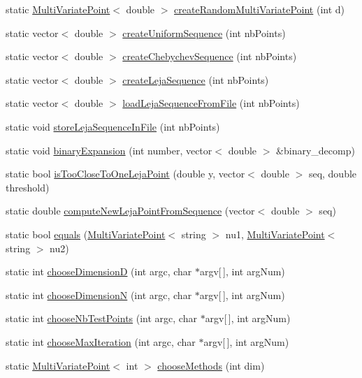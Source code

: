 \begin{DoxyCompactItemize}
\item 
static \hyperlink{class_multi_variate_point}{Multi\+Variate\+Point}$<$ double $>$ \hyperlink{class_utils_a09a5b487abbd8c2233734aed6679a13a}{create\+Random\+Multi\+Variate\+Point} (int d)
\item 
static vector$<$ double $>$ \hyperlink{class_utils_aa03bde098ebd8a96a4a12b9581ea4721}{create\+Uniform\+Sequence} (int nb\+Points)
\item 
static vector$<$ double $>$ \hyperlink{class_utils_aa8b8ff1c9c1d271633aa9dd36990bd27}{create\+Chebychev\+Sequence} (int nb\+Points)
\item 
static vector$<$ double $>$ \hyperlink{class_utils_a829167caad4d105e52c1d4af4924a358}{create\+Leja\+Sequence} (int nb\+Points)
\item 
static vector$<$ double $>$ \hyperlink{class_utils_a13a74fc44a3300bc4053c92a98f9b55a}{load\+Leja\+Sequence\+From\+File} (int nb\+Points)
\item 
static void \hyperlink{class_utils_ace57ec8e6b8ac71fc13588c32f8e449e}{store\+Leja\+Sequence\+In\+File} (int nb\+Points)
\item 
static void \hyperlink{class_utils_a6ebd26c0dd01e720bcffc849c8a80e19}{binary\+Expansion} (int number, vector$<$ double $>$ \&binary\+\_\+decomp)
\item 
static bool \hyperlink{class_utils_aae5c071adea20e986aabc71119edb16f}{is\+Too\+Close\+To\+One\+Leja\+Point} (double y, vector$<$ double $>$ seq, double threshold)
\item 
static double \hyperlink{class_utils_a66a782d0cbfd519114e83c7be8139fea}{compute\+New\+Leja\+Point\+From\+Sequence} (vector$<$ double $>$ seq)
\item 
static bool \hyperlink{class_utils_ac7682da7749f473263a0f5dcdff946ce}{equals} (\hyperlink{class_multi_variate_point}{Multi\+Variate\+Point}$<$ string $>$ nu1, \hyperlink{class_multi_variate_point}{Multi\+Variate\+Point}$<$ string $>$ nu2)
\item 
static int \hyperlink{class_utils_ad56041abf23e7685a62bceef03a1042c}{choose\+DimensionD} (int argc, char $\ast$argv\mbox{[}$\,$\mbox{]}, int arg\+Num)
\item 
static int \hyperlink{class_utils_ac2699669d4b3c52444f3ac1ecb3252d4}{choose\+DimensionN} (int argc, char $\ast$argv\mbox{[}$\,$\mbox{]}, int arg\+Num)
\item 
static int \hyperlink{class_utils_a731fc80e8a40340da4dc1759fbd3f4cd}{choose\+Nb\+Test\+Points} (int argc, char $\ast$argv\mbox{[}$\,$\mbox{]}, int arg\+Num)
\item 
static int \hyperlink{class_utils_a030f2ded6b187b06a7f7994eb77a48a0}{choose\+Max\+Iteration} (int argc, char $\ast$argv\mbox{[}$\,$\mbox{]}, int arg\+Num)
\item 
static \hyperlink{class_multi_variate_point}{Multi\+Variate\+Point}$<$ int $>$ \hyperlink{class_utils_a42c046d922bf1427907e75ec027b175d}{choose\+Methods} (int dim)
\end{DoxyCompactItemize}
